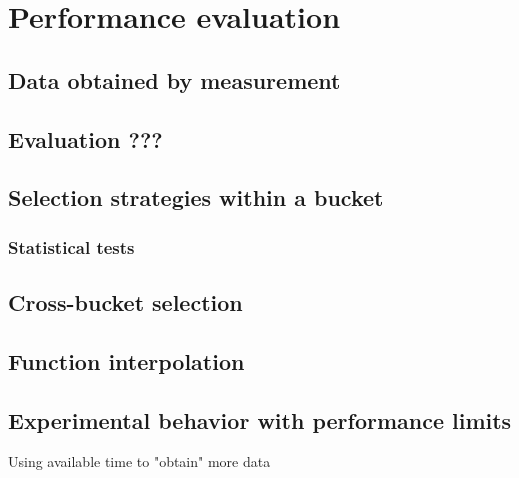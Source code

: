 \chapter{Performance evaluation}

\section{Data obtained by measurement}

\section{Evaluation ???}

\section{Selection strategies within a bucket}

\subsection{Statistical tests}

\section{Cross-bucket selection}

\section{Function interpolation}

\section{Experimental behavior with performance limits}
Using available time to "obtain" more data

